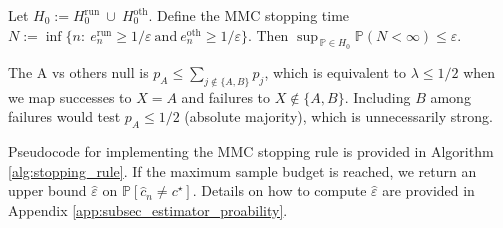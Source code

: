 \begin{corollary}\label{cor:union_recursive}
Let $H_0:=H^{\mathrm{run}}_0\ \cup\ H^{\mathrm{oth}}_0$. Define the MMC stopping time
$N:=\inf\{n:\ e^{\mathrm{run}}_n\ge 1/\varepsilon\ \text{and}\ e^{\mathrm{oth}}_n\ge 1/\varepsilon\}$.
Then $\sup_{\,\mathbb P\in H_0}\mathbb P(N<\infty)\le \varepsilon$.
\end{corollary}

\begin{remark}
The A vs others null is $p_A \le \sum_{j\notin\{A,B\}}p_j$, which is equivalent to
$\lambda \le 1/2$ when we map successes to $X=A$ and failures to $X\notin\{A,B\}$.
Including $B$ among failures would test $p_A\le 1/2$ (absolute majority), which is unnecessarily strong.
\end{remark}

Pseudocode for implementing the MMC stopping rule is provided in Algorithm \ref{alg:stopping_rule}. If the maximum sample budget is reached, we return an upper bound $\hat{\varepsilon}$ on $\mathbb{P}[\hat{c}_n\neq c^\star]$. Details on how to compute $\hat{\varepsilon}$ are provided in Appendix \ref{app:subsec_estimator_proability}.

